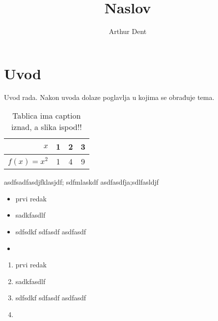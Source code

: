 \documentclass[times, utf8, zavrsni]{fer}
\begin{document}

\title{Naslov}

\author{Arthur Dent}

\maketitle

\izvornik

\zahvala{}

\tableofcontents

\chapter{Uvod}
Uvod rada. Nakon uvoda dolaze poglavlja u kojima se obrađuje tema.

\begin{table}[h!]
\caption{Tablica ima caption iznad, a slika ispod!!}
\label{tbl:kvadrati}
  \centering
  \begin{tabular}{r | c c c}
  $x$ & 1 & 2 & 3 \\ \hline
  $f(x) = x^2$ & 1 & 4 & 9
  \end{tabular}
  \end{table}

asdfsadfasdjfklasjdf;
sdfmlaskdf
asdfasdfja;sdlfasldjf

\begin{itemize}
  \item prvi redak
  \item sadkfasdlf
  \item sdfsdkf
  sdfasdf
  asdfasdf
  \item
\end{itemize}

\begin{enumerate}
  \item prvi redak
  \item sadkfasdlf
  \item sdfsdkf
  sdfasdf
  asdfasdf
  \item
\end{enumerate}
\end{document}
